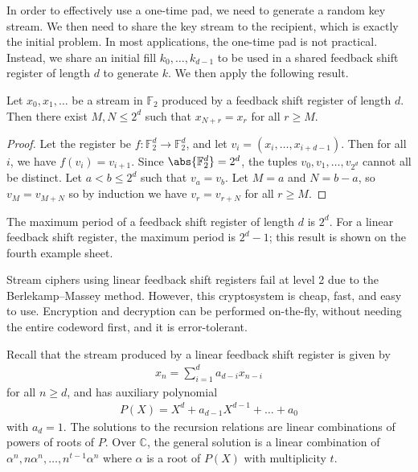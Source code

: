 In order to effectively use a one-time pad, we need to generate a random key stream.
We then need to share the key stream to the recipient, which is exactly the initial problem.
In most applications, the one-time pad is not practical.
Instead, we share an initial fill $k_0, \dots, k_{d-1}$ to be used in a shared feedback shift register of length $d$ to generate $k$.
We then apply the following result.
\begin{lemma}
    Let $x_0, x_1, \dots$ be a stream in $\mathbb F_2$ produced by a feedback shift register of length $d$.
    Then there exist $M, N \leq 2^d$ such that $x_{N+r} = x_{r}$ for all $r \geq M$.
\end{lemma}
\begin{proof}
    Let the register be $f \colon \mathbb F_2^d \to \mathbb F_2^d$, and let $v_i = (x_i, \dots, x_{i+d-1})$.
    Then for all $i$, we have $f(v_i) = v_{i+1}$.
    Since $\abs{\mathbb F_2^d} = 2^d$, the tuples $v_0, v_1, \dots, v_{2^d}$ cannot all be distinct.
    Let $a < b \leq 2^d$ such that $v_a = v_b$.
    Let $M = a$ and $N = b - a$, so $v_M = v_{M+N}$ so by induction we have $v_r = v_{r+N}$ for all $r \geq M$.
\end{proof}
\begin{remark}
    The maximum period of a feedback shift register of length $d$ is $2^d$.
    For a linear feedback shift register, the maximum period is $2^d - 1$; this result is shown on the fourth example sheet.

    Stream ciphers using linear feedback shift registers fail at level 2 due to the Berlekamp--Massey method.
    However, this cryptosystem is cheap, fast, and easy to use.
    Encryption and decryption can be performed on-the-fly, without needing the entire codeword first, and it is error-tolerant.
\end{remark}
Recall that the stream produced by a linear feedback shift register is given by
\begin{align*}
    x_n = \sum_{i=1}^d a_{d-i} x_{n-i}
\end{align*}
for all $n \geq d$, and has auxiliary polynomial
\begin{align*}
    P(X) = X^d + a_{d-1}X^{d-1} + \dots + a_0
\end{align*}
with $a_d = 1$.
The solutions to the recursion relations are linear combinations of powers of roots of $P$.
Over $\mathbb C$, the general solution is a linear combination of $\alpha^n, n\alpha^n, \dots, n^{t-1} \alpha^n$ where $\alpha$ is a root of $P(X)$ with multiplicity $t$.

